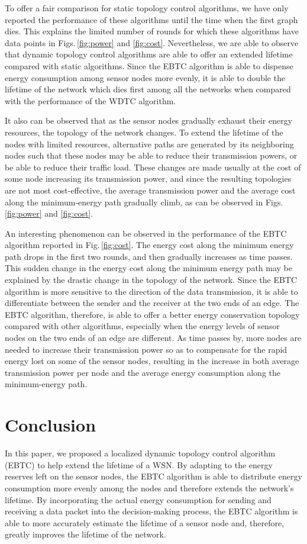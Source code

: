 \documentclass[journal,12pt,onecolumn]{IEEEtran}
\begin{document}
To offer a fair comparison for static topology control algorithms, we
have only reported the performance of these algorithms until the time
when the first graph dies. This explains the limited number of rounds
for which these algorithms have data points in Figs.\,\ref{fig:power}
and \ref{fig:cost}. Nevertheless, we are able to observe that dynamic
topology control algorithms are able to offer an extended lifetime
compared with static algorithms. Since the EBTC algorithm is able to
dispense energy consumption among sensor nodes more evenly, it is able
to double the lifetime of the network which dies first among all the
networks when compared with the performance of the WDTC algorithm.

It also can be observed that as the sensor nodes gradually exhaust their
energy resources, the topology of the network changes. To extend the
lifetime of the nodes with limited resources, alternative paths are
generated by its neighboring nodes such that these nodes may be able
to reduce their transmission powers, or be able to reduce their traffic load. These changes are made usually
at the cost of some node increasing its transmission power, and
since the resulting topologies are not most cost-effective, the
average transmission power and the average cost along the
minimum-energy path gradually climb, as can be observed in
Figs.\,\ref{fig:power} and \ref{fig:cost}.

An interesting phenomenon can be observed in the performance of the
EBTC algorithm reported in Fig.\,\ref{fig:cost}. The energy cost
along the minimum energy path drops in the first two
rounds, and then gradually increases as time passes. This sudden change in
the energy cost along the minimum energy path may be explained by
the drastic change in the topology of the network. Since the EBTC
algorithm is more sensitive to the direction of the data
transmission, it is able to differentiate between the sender and the
receiver at the two ends of an edge. The EBTC algorithm, therefore, is
able to offer a better energy conservation topology compared with
other algorithms, especially when the energy levels of sensor
nodes on the two ends of an edge are different. As time passes by,
more nodes are needed to increase their transmission power so as to
compensate for the rapid energy lost on some of the sensor nodes,
resulting in the increase in both average transmission power per node
and the average energy consumption along the minimum-energy path.


\section{Conclusion}\label{sec:conclusion}
In this paper, we proposed a localized dynamic topology control
algorithm (EBTC) to help extend the lifetime of a WSN. By adapting to the energy reserves left on the sensor nodes,
the EBTC algorithm is able to distribute energy consumption more
evenly among the nodes and therefore extends the network's
lifetime. By incorporating the actual energy consumption for sending
and receiving a data packet into the decision-making process, the
EBTC algorithm is able to more accurately estimate the lifetime of a sensor node and,
therefore, greatly improves the lifetime of the network.
\end{document}
